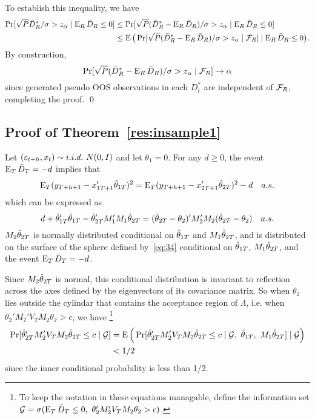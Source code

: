 \documentclass[12pt]{article}
\begin{document}
To establish this inequality, we have
\begin{align*}
  \Pr[\sqrt{P} \bar{D}_{R}^* / \sigma > z_\alpha \mid \operatorname{E}_R \bar{D}_{R} \leq 0]
  &\leq \Pr[\sqrt{P} (\bar{D}_{R}^* - \operatorname{E}_R \bar{D}_{R}) / \sigma > z_\alpha
  \mid \operatorname{E}_R \bar{D}_{R} \leq 0] \\
  &\leq \operatorname{E}\big(
  \Pr[\sqrt{P} (\bar{D}_{R}^* - \operatorname{E}_R \bar{D}_{R}) / \sigma > z_\alpha \mid \mathcal{F}_R]
  \mid \operatorname{E}_R \bar{D}_{R} \leq 0\big).
\end{align*}
By construction,
\begin{equation*}
  \Pr[\sqrt{P} (\bar{D}_{R}^* - \operatorname{E}_R \bar{D}_{R}) / \sigma > z_\alpha \mid \mathcal{F}_R]
  \to \alpha
\end{equation*}
since generated pseudo OOS observations in each $D_t^*$ are
independent of $\mathcal{F}_R$, completing the proof.
\qed

\subsection*{Proof of Theorem~\ref{res:insample1}}

Let $(\e_{t+h}, x_{t}) \sim i.i.d.\ N(0,I)$ and let $\theta_1 = 0$.
For any $d \geq 0$, the event $\operatorname{E}_T \bar{D}_{T} = -d$ implies that
\begin{equation*}
  \operatorname{E}_T (y_{T+h+1} - x_{1T+1}'\hat\theta_{1T})^2
  = \operatorname{E}_T (y_{T+h+1} - x_{2T+1}'\hat\theta_{2T})^2 - d \quad a.s.
\end{equation*}
which can be expressed as
\begin{equation}\label{eq:34}
  d + \hat\theta_{1T}'\hat\theta_{1T} - \hat\theta_{2T}'M_1'M_1\hat\theta_{2T}
  = (\hat\theta_{2T} - \theta_2)' M_2'M_2 (\hat\theta_{2T} - \theta_2) \quad a.s.
\end{equation}
$M_2 \hat\theta_{2T}$ is normally distributed conditional on $\hat\theta_{1T}$ and
$M_1 \hat\theta_{2T}$, and is distributed on the surface of the sphere defined
by~\eqref{eq:34} conditional on $\hat\theta_{1T}$, $M_1 \hat\theta_{2T}$, and the
event $\operatorname{E}_T \bar{D}_{T} = -d$.

Since $M_2 \hat\theta_{2T}$ is normal, this conditional distribution is
invariant to reflection across the axes defined by the eigenvectors of
its covariance matrix. So when $\theta_2$ lies outside the cylindar
that contains the acceptance region of $\Lambda$, i.e. when
$\theta_2'M_2' V_T M_2 \theta_2 > c$, we have%
\footnote{To keep the notation in these equations managable, define
  the information set $\mathcal{G} = \sigma(\operatorname{E}_T \bar{D}_{T} \leq 0,~ \theta_2'M_2'
  V_T M_2 \theta_2 > c)$.} %
\begin{align*}
  \Pr[ \hat\theta_{2T}' M_2' V_T M_2 \hat\theta_{2T} \leq c \mid \mathcal{G}]
  &= \operatorname{E}\Big( \Pr[ \hat\theta_{2T}'M_2' V_T M_2 \hat\theta_{2T} \leq c \mid \mathcal{G},~\hat\theta_{1T},~M_1 \hat\theta_{2T}] \mid \mathcal{G} \Big) \\
  & < 1/2
\end{align*}
since the inner conditional probability is less than 1/2.
\end{document}
